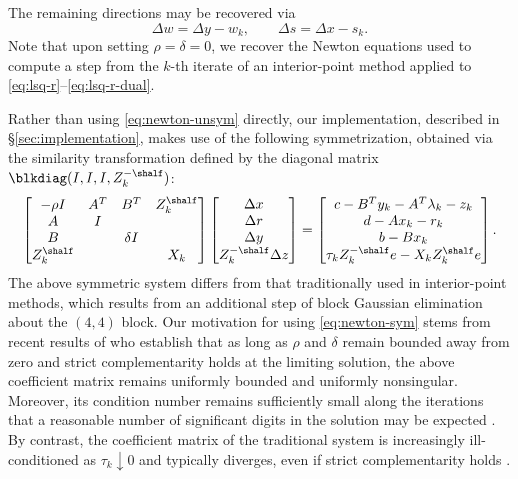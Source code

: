 \documentclass{amsart}
\begin{document}
The remaining directions may be recovered via
\begin{equation}
  \label{eq:other-dirs}
  \Delta w = \Delta y - w_k, \qquad
  \Delta s = \Delta x - s_k.
\end{equation}
Note that upon setting $\rho = \delta = 0$, we recover the Newton equations
used to compute a step from the $k$-th iterate of an interior-point method
applied to \eqref{eq:lsq-r}--\eqref{eq:lsq-r-dual}.

Rather than using \eqref{eq:newton-unsym} directly, our implementation,
described in \S\ref{sec:implementation}, makes use of
the following symmetrization, obtained via the similarity transformation
defined by the diagonal matrix $\blkdiag(I, I, I, Z_k^{-\shalf})$:
\begin{equation}
  \label{eq:newton-sym}
  \begin{bmatrix}
    -\rho I        & A^T & B^T      & Z_k^{\shalf} \\
     A             & I   &          &               \\
     B             &     & \delta I &               \\
     Z_k^{\shalf} &     &          &  X_k
  \end{bmatrix}
  \begin{bmatrix}
    \Delta x \\ \Delta r \\ \Delta y \\ Z_k^{-\shalf} \Delta z
  \end{bmatrix}
  =
  \begin{bmatrix}
    c - B^T y_k - A^T \lambda_k - z_k \\
    d - A x_k - r_k \\
    b - B x_k \\
    \tau_k Z_k^{-\shalf} e - X_k Z_k^{\shalf} e
  \end{bmatrix}.
\end{equation}
The above symmetric system differs from that traditionally used in
interior-point methods, which results from an additional step of block Gaussian
elimination about the $(4,4)$ block. Our motivation for using
\eqref{eq:newton-sym} stems from recent results of
\cite{greif-moulding-orban-2012} who establish that as long as $\rho$ and
$\delta$ remain bounded away from zero and strict complementarity holds at the
limiting solution, the above coefficient matrix remains uniformly bounded and
uniformly nonsingular. Moreover, its condition number remains sufficiently
small along the iterations that a reasonable number of significant digits in
the solution may be expected \citep[\S4]{greif-moulding-orban-2012}.
By contrast, the coefficient matrix of the traditional system is increasingly
ill-conditioned as $\tau_k \downarrow 0$ and typically diverges, even if strict
complementarity holds \citep[\S3]{greif-moulding-orban-2012}.
\end{document}
